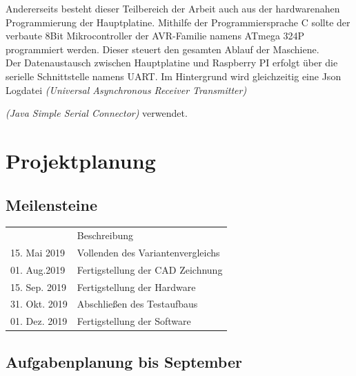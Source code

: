 Andererseits besteht dieser Teilbereich der Arbeit auch aus der hardwarenahen Programmierung der Hauptplatine. Mithilfe der Programmiersprache C sollte der verbaute 8Bit Mikrocontroller der AVR-Familie namens ATmega 324P programmiert werden.
Dieser steuert den gesamten Ablauf der Maschiene. \\

Der Datenaustausch zwischen Hauptplatine und Raspberry PI erfolgt über die serielle Schnittstelle namens UART.
Im Hintergrund wird gleichzeitig eine Json Logdatei
{\itshape (Universal Asynchronous Receiver Transmitter)}

{\itshape (Java Simple Serial Connector)}  verwendet.
\chapter{Projektplanung}
\label{sec:Projektplanung}
\section{Meilensteine}
\begin{table}[h!]
    \begin{tabular}{ll}
        \hline
        \rowcolor[HTML]{C0C0C0}
        \multicolumn{2}{c}{\cellcolor[HTML]{C0C0C0}\textbf{Meilensteine}}                      \\ \hline
        \rowcolor[HTML]{EFEFEF}
        \multicolumn{1}{l|}{\cellcolor[HTML]{EFEFEF}Datum} & Beschreibung                      \\ \hline
        \multicolumn{1}{l|}{15. Mai 2019}                   & Vollenden des Variantenvergleichs \\ \hline
        \multicolumn{1}{l|}{01. Aug.2019}                    & Fertigstellung der CAD Zeichnung  \\ \hline
        \multicolumn{1}{l|}{15. Sep. 2019}                   & Fertigstellung der Hardware       \\ \hline
        \multicolumn{1}{l|}{31. Okt. 2019}                   & Abschließen des Testaufbaus       \\ \hline
        \multicolumn{1}{l|}{01. Dez. 2019}                    & Fertigstellung der Software       \\ \hline
    \end{tabular}
\end{table}

\section{Aufgabenplanung bis September}

